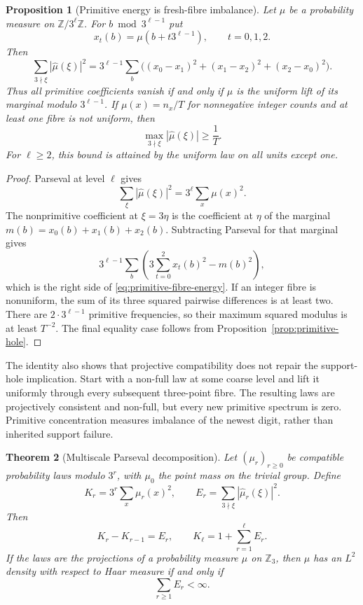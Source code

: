 \documentclass[11pt]{article}
\newtheorem{theorem}{Theorem}[section]
\newtheorem{proposition}[theorem]{Proposition}
\theoremstyle{definition}
\theoremstyle{remark}
\begin{document}
\begin{proposition}[Primitive energy is fresh-fibre imbalance]
\label{prop:primitive-fibre-energy}
Let $\mu$ be a probability measure on $\mathbb Z/3^\ell\mathbb Z$.
For $b\bmod 3^{\ell-1}$ put
\[
 x_t(b)=\mu(b+t3^{\ell-1}),\qquad t=0,1,2.
\]
Then
\begin{equation}\label{eq:primitive-fibre-energy}
 \sum_{3\nmid\xi}|\widehat\mu(\xi)|^2
 =3^{\ell-1}\sum_b\bigl((x_0-x_1)^2+(x_1-x_2)^2+(x_2-x_0)^2\bigr).
\end{equation}
Thus all primitive coefficients vanish if and only if $\mu$ is the
uniform lift of its marginal modulo $3^{\ell-1}$. If
$\mu(x)=n_x/T$ for nonnegative integer counts and at least one fibre is
not uniform, then
\[
 \max_{3\nmid\xi}|\widehat\mu(\xi)|\ge\frac1T.
\]
For $\ell\ge2$, this bound is attained by the uniform law on all units
except one.
\end{proposition}

\begin{proof}
Parseval at level $\ell$ gives
\[
 \sum_\xi|\widehat\mu(\xi)|^2=3^\ell\sum_x\mu(x)^2.
\]
The nonprimitive coefficient at $\xi=3\eta$ is the coefficient at
$\eta$ of the marginal
$m(b)=x_0(b)+x_1(b)+x_2(b)$. Subtracting Parseval for that marginal
gives
\[
 3^{\ell-1}\sum_b
 \left(3\sum_{t=0}^2x_t(b)^2-m(b)^2\right),
\]
which is the right side of \eqref{eq:primitive-fibre-energy}. If an
integer fibre is nonuniform, the sum of its three squared pairwise
differences is at least two. There are $2\cdot3^{\ell-1}$ primitive
frequencies, so their maximum squared modulus is at least $T^{-2}$.
The final equality case follows from
Proposition~\ref{prop:primitive-hole}.
\end{proof}

The identity also shows that projective compatibility does not repair
the support-hole implication. Start with a non-full law at some coarse
level and lift it uniformly through every subsequent three-point
fibre. The resulting laws are projectively consistent and non-full,
but every new primitive spectrum is zero. Primitive concentration
measures imbalance of the newest digit, rather than inherited support
failure.

\begin{theorem}[Multiscale Parseval decomposition]
\label{thm:multiscale-parseval}
Let $(\mu_r)_{r\ge0}$ be compatible probability laws modulo $3^r$,
with $\mu_0$ the point mass on the trivial group. Define
\[
 K_r=3^r\sum_x\mu_r(x)^2,\qquad
 E_r=\sum_{3\nmid\xi}|\widehat\mu_r(\xi)|^2.
\]
Then
\begin{equation}\label{eq:multiscale-parseval}
 K_r-K_{r-1}=E_r,\qquad
 K_\ell=1+\sum_{r=1}^\ell E_r.
\end{equation}
If the laws are the projections of a probability measure $\mu$ on
$\mathbb Z_3$, then $\mu$ has an $L^2$ density with respect to Haar
measure if and only if
\[
 \sum_{r\ge1}E_r<\infty.
\]
\end{theorem}
\end{document}
